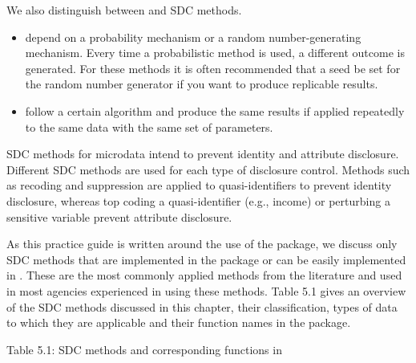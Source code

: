 \documentclass[letterpaper,10pt,english]{sphinxmanual}
\begin{document}
We also distinguish between  and  SDC
methods.
\begin{itemize}
\item {} 
 depend on a probability mechanism or a
random number-generating mechanism. Every time a probabilistic method
is used, a different outcome is generated. For these methods it is
often recommended that a seed be set for the random number generator
if you want to produce replicable results.

\item {} 
 follow a certain algorithm and produce the
same results if applied repeatedly to the same data with the same set
of parameters.

\end{itemize}

SDC methods for microdata intend to prevent identity and attribute
disclosure. Different SDC methods are used for each type of disclosure
control. Methods such as recoding and suppression are applied to
quasi-identifiers to prevent identity disclosure, whereas top coding a
quasi-identifier (e.g., income) or perturbing a sensitive variable
prevent attribute disclosure.

As this practice guide is written around the use of the 
package, we discuss only SDC methods that are implemented in the
 package or can be easily implemented in . These are the
most commonly applied methods from the literature and used in most
agencies experienced in using these methods. Table 5.1 gives an overview
of the SDC methods discussed in this chapter, their classification,
types of data to which they are applicable and their function names in
the  package.

Table 5.1: SDC methods and corresponding functions in 
\end{document}
